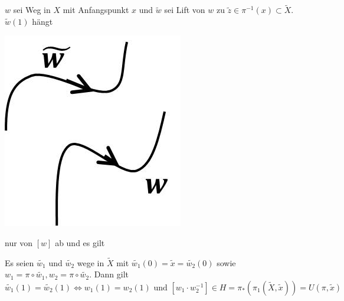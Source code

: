 \documentclass[a4paper,11pt,notitlepage]{report}
\theoremstyle{definition}
\begin{document}
	$w$ sei Weg in $X$ mit Anfangspunkt $x$ und $\widetilde{w}$ sei Lift von $w$ zu $\widetilde{z} \in \pi^{-1}(x) \subset \widetilde{X}$. $\widetilde{w}(1)$ hängt \begin{center}
	 	\includegraphics[scale=0.5]{images/2011_12_20_Bild3.jpg}
	 \end{center} nur von $[w]$ ab und es gilt

\begin{theorem}
	Es seien $\widetilde{w_1}$ und $\widetilde{w_2}$ wege in $\widetilde{X}$ mit $\widetilde{w_1}(0) = \widetilde{x} = \widetilde{w_2}(0)$ sowie $w_1 = \pi \circ \widetilde{w_1}, w_2 = \pi \circ \widetilde{w_2}$. Dann gilt
	$$\widetilde{w_1}(1) = \widetilde{w_2}(1) \Leftrightarrow w_1(1) = w_2(1) \text{ und } [w_1 \cdot w_2^{-1}] \in H = \pi_*(\pi_1(\widetilde{X}, \widetilde{x})) = U(\pi, \widetilde{x})$$
\end{theorem}
\end{document}
